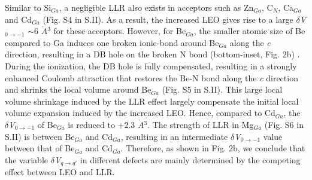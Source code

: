 \documentclass[onecolumn,preprint,superscriptaddress]{revtex4-1}
\begin{document}
Similar to Si$_{Ga}$, a negligible LLR also exists in acceptors such as Zn$_{Ga}$, C$_N$, Ca$_{Ga}$ and Cd$_{Ga}$ (Fig. S4 in S.II). As a result, the increased LEO gives rise to a large $\delta$\emph{V}$_{0\rightarrow -1}$ $\sim$6 $\mathring{A}$$^3$ for these acceptors. However, for Be$_{Ga}$, the smaller atomic size of Be compared to Ga induces one broken ionic-bond around Be$_{Ga}$ along the \emph{c} direction, resulting in a DB hole on the broken N bond (bottom-inset, Fig. 2b) \cite{46}. During the ionization, the DB hole is fully compensated, resulting in a strongly enhanced Coulomb attraction that restores the Be-N bond along the \emph{c} direction and shrinks the local volume around Be$_{Ga}$ (Fig. S5 in S.II). This large local volume shrinkage induced by the LLR effect largely compensate the initial local volume expansion induced by the increased LEO. Hence, compared to Cd$_{Ga}$, the $\delta$\emph{V}$_{0\rightarrow -1}$ of Be$_{Ga}$ is reduced to +2.3 $\mathring{A}$$^3$. The strength of LLR in Mg$_{Ga}$ (Fig. S6 in S.II) is between Be$_{Ga}$ and Cd$_{Ga}$, resulting in an intermediate $\delta$\emph{V}$_{0\rightarrow -1}$ value between that of Be$_{Ga}$ and Cd$_{Ga}$. Therefore, as shown in Fig. 2b, we conclude that the variable $\delta$\emph{V}$_{q\rightarrow q'}$ in different defects are mainly determined by the competing effect between LEO and LLR.
\end{document}
